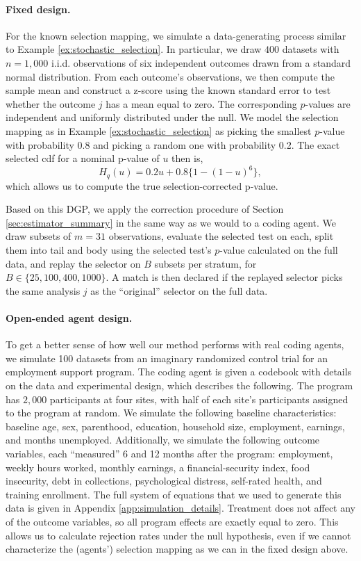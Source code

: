 \documentclass[10pt]{article}
\begin{document}
\paragraph{Fixed design.} For the known selection mapping, we simulate a data-generating process similar to Example \ref{ex:stochastic_selection}. In particular, we draw $400$ datasets with $n=1{,}000$ i.i.d. observations of six independent outcomes drawn from a standard normal distribution. From each outcome's observations, we then compute the sample mean and construct a z-score using the known standard error to test whether the outcome $j$ has a mean equal to zero. The corresponding $p$-values are independent and uniformly distributed under the null. We model the selection mapping as in Example \ref{ex:stochastic_selection} as picking the smallest $p$-value with probability 0.8 and picking a random one with probability 0.2. The exact selected cdf for a nominal p-value of $u$ then is,
\begin{equation} \label{eq:fixed_exact_H}
H_q(u)=0.2u+0.8\{1-(1-u)^6\},
\end{equation}
which allows us to compute the true selection-corrected p-value.

Based on this DGP, we apply the correction procedure of Section \ref{sec:estimator_summary} in the same way as we would to a coding agent. We draw subsets of $m=31$ observations, evaluate the selected test on each, split them into tail and body using the selected test's $p$-value calculated on the full data, and replay the selector on $B$ subsets per stratum, for $B \in \{25,100, 400, 1000\}$. A match is then declared if the replayed selector picks the same analysis $j$ as the ``original'' selector on the full data.

\paragraph{Open-ended agent design.} To get a better sense of how well our method performs with real coding agents, we simulate 100 datasets from an imaginary randomized control trial for an employment support program. The coding agent is given a codebook with details on the data and experimental design, which describes the following. The program has $2{,}000$ participants at four sites, with half of each site's participants assigned to the program at random. We simulate the following baseline characteristics: baseline age, sex, parenthood, education, household size, employment, earnings, and months unemployed. Additionally, we simulate the following outcome variables, each ``measured'' 6 and 12 months after the program: employment, weekly hours worked, monthly earnings, a financial-security index, food insecurity, debt in collections, psychological distress, self-rated health, and training enrollment. The full system of equations that we used to generate this data is given in Appendix \ref{app:simulation_details}. Treatment does not affect any of the outcome variables, so all program effects are exactly equal to zero. This allows us to calculate rejection rates under the null hypothesis, even if we cannot characterize the (agents') selection mapping as we can in the fixed design above.
\end{document}
